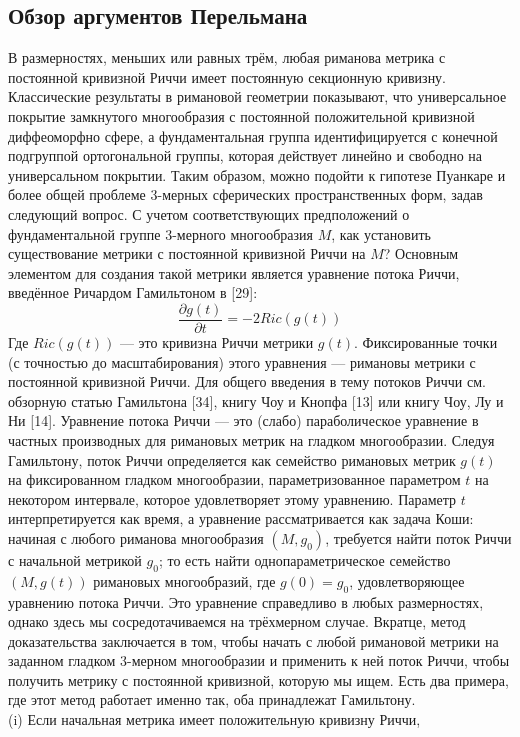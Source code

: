 \subsection{Обзор аргументов Перельмана}
В размерностях, меньших или равных трём, любая риманова метрика с 
постоянной кривизной Риччи имеет постоянную секционную кривизну. 
Классические результаты в римановой геометрии показывают, что 
универсальное покрытие замкнутого многообразия с постоянной 
положительной кривизной диффеоморфно сфере, а фундаментальная 
группа идентифицируется с конечной подгруппой ортогональной группы, 
которая действует линейно и свободно на универсальном покрытии. 
Таким образом, можно подойти к гипотезе Пуанкаре и более общей 
проблеме 3-мерных сферических пространственных форм, задав следующий 
вопрос. С учетом соответствующих предположений о фундаментальной 
группе 3-мерного многообразия $M$, как установить существование 
метрики с постоянной кривизной Риччи на $M$? 
Основным элементом для создания такой метрики является уравнение 
потока Риччи, введённое Ричардом Гамильтоном в [29]:
\[
\frac{\partial g(t)}{\partial t} = -2Ric(g(t))
\]
Где $Ric(g(t))$ — это кривизна Риччи метрики $g(t)$. Фиксированные точки 
(с точностью до масштабирования) этого уравнения — римановы метрики с 
постоянной кривизной Риччи. Для общего введения в тему потоков Риччи 
см. обзорную статью Гамильтона [34], книгу Чоу и Кнопфа [13] или 
книгу Чоу, Лу и Ни [14].
Уравнение потока Риччи — это (слабо) параболическое уравнение в 
частных производных для римановых метрик на гладком многообразии. 
Следуя Гамильтону, поток Риччи определяется как семейство римановых 
метрик $g(t)$ на фиксированном гладком многообразии, параметризованное параметром 
$t$ на некотором интервале, которое удовлетворяет этому уравнению. 
Параметр $t$ интерпретируется как время, а уравнение рассматривается 
как задача Коши: начиная с любого риманова многообразия $(M, g_{0})$, 
требуется найти поток Риччи с начальной метрикой $g_{0}$; то есть найти 
однопараметрическое семейство $(M, g(t))$ римановых многообразий, 
где $g(0) = g_{0}$, удовлетворяющее уравнению потока Риччи. 
Это уравнение справедливо в любых размерностях, однако здесь мы 
сосредотачиваемся на трёхмерном случае.
Вкратце, метод доказательства заключается в том, чтобы начать с 
любой римановой метрики на заданном гладком 3-мерном многообразии 
и применить к ней поток Риччи, чтобы получить метрику с постоянной 
кривизной, которую мы ищем. Есть два примера, где этот метод 
работает именно так, оба принадлежат Гамильтону.\\
(i) Если начальная метрика имеет положительную кривизну Риччи, 
